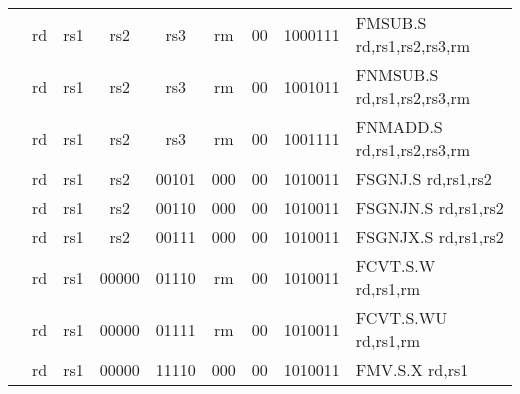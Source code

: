\begin{table}[p]
\begin{small}
\begin{center}
\begin{tabular}{rccccccccccl}
&
\multicolumn{1}{|c|}{rd} &
\multicolumn{1}{c|}{rs1} &
\multicolumn{1}{c|}{rs2} &
\multicolumn{3}{c|}{rs3} &
\multicolumn{2}{c|}{rm} &
\multicolumn{1}{c|}{00} &
\multicolumn{1}{c|}{1000111} & FMSUB.S rd,rs1,rs2,rs3,rm \\
\cline{2-11}
  

&
\multicolumn{1}{|c|}{rd} &
\multicolumn{1}{c|}{rs1} &
\multicolumn{1}{c|}{rs2} &
\multicolumn{3}{c|}{rs3} &
\multicolumn{2}{c|}{rm} &
\multicolumn{1}{c|}{00} &
\multicolumn{1}{c|}{1001011} & FNMSUB.S rd,rs1,rs2,rs3,rm \\
\cline{2-11}
  

&
\multicolumn{1}{|c|}{rd} &
\multicolumn{1}{c|}{rs1} &
\multicolumn{1}{c|}{rs2} &
\multicolumn{3}{c|}{rs3} &
\multicolumn{2}{c|}{rm} &
\multicolumn{1}{c|}{00} &
\multicolumn{1}{c|}{1001111} & FNMADD.S rd,rs1,rs2,rs3,rm \\
\cline{2-11}
  

&
\multicolumn{1}{|c|}{rd} &
\multicolumn{1}{c|}{rs1} &
\multicolumn{1}{c|}{rs2} &
\multicolumn{3}{c|}{00101} &
\multicolumn{2}{c|}{000} &
\multicolumn{1}{c|}{00} &
\multicolumn{1}{c|}{1010011} & FSGNJ.S rd,rs1,rs2 \\
\cline{2-11}
  

&
\multicolumn{1}{|c|}{rd} &
\multicolumn{1}{c|}{rs1} &
\multicolumn{1}{c|}{rs2} &
\multicolumn{3}{c|}{00110} &
\multicolumn{2}{c|}{000} &
\multicolumn{1}{c|}{00} &
\multicolumn{1}{c|}{1010011} & FSGNJN.S rd,rs1,rs2 \\
\cline{2-11}
  

&
\multicolumn{1}{|c|}{rd} &
\multicolumn{1}{c|}{rs1} &
\multicolumn{1}{c|}{rs2} &
\multicolumn{3}{c|}{00111} &
\multicolumn{2}{c|}{000} &
\multicolumn{1}{c|}{00} &
\multicolumn{1}{c|}{1010011} & FSGNJX.S rd,rs1,rs2 \\
\cline{2-11}
  

&
\multicolumn{1}{|c|}{rd} &
\multicolumn{1}{c|}{rs1} &
\multicolumn{1}{c|}{00000} &
\multicolumn{3}{c|}{01110} &
\multicolumn{2}{c|}{rm} &
\multicolumn{1}{c|}{00} &
\multicolumn{1}{c|}{1010011} & FCVT.S.W rd,rs1,rm \\
\cline{2-11}
  

&
\multicolumn{1}{|c|}{rd} &
\multicolumn{1}{c|}{rs1} &
\multicolumn{1}{c|}{00000} &
\multicolumn{3}{c|}{01111} &
\multicolumn{2}{c|}{rm} &
\multicolumn{1}{c|}{00} &
\multicolumn{1}{c|}{1010011} & FCVT.S.WU rd,rs1,rm \\
\cline{2-11}
  

&
\multicolumn{1}{|c|}{rd} &
\multicolumn{1}{c|}{rs1} &
\multicolumn{1}{c|}{00000} &
\multicolumn{3}{c|}{11110} &
\multicolumn{2}{c|}{000} &
\multicolumn{1}{c|}{00} &
\multicolumn{1}{c|}{1010011} & FMV.S.X rd,rs1 \\
\cline{2-11}
  


\end{tabular}
\end{center}
\end{small}
\end{table}

